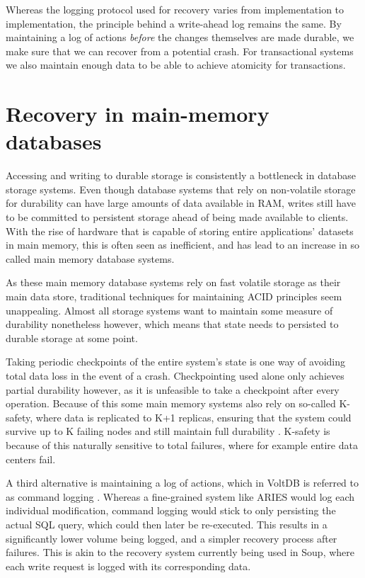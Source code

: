 \documentclass[b5paper]{report}
\begin{document}
Whereas the logging protocol used for recovery varies from implementation to
implementation, the principle behind a write-ahead log remains the same. By
maintaining a log of actions \textit{before} the changes themselves are made
durable, we make sure that we can recover from a potential crash. For
transactional systems we also maintain enough data to be able to achieve
atomicity for transactions.

\section{Recovery in main-memory databases} \label{main-memory-recovery}
Accessing and writing to durable storage is consistently a bottleneck in
database storage systems. Even though database systems that rely on non-volatile
storage for durability can have large amounts of data available in RAM, writes
still have to be committed to persistent storage ahead of being made available
to clients. With the rise of hardware that is capable of storing entire
applications' datasets in main memory, this is often seen as inefficient,
and has lead to an increase in so called main memory database systems.

As these main memory database systems rely on fast volatile storage as their
main data store, traditional techniques for maintaining ACID principles seem
unappealing. Almost all storage systems want to maintain some measure of
durability nonetheless however, which means that state needs to persisted to
durable storage at some point.

Taking periodic checkpoints of the entire system's state is one way of avoiding
total data loss in the event of a crash. Checkpointing used alone only achieves
partial durability however, as it is unfeasible to take a checkpoint after every
operation. Because of this some main memory systems also rely on so-called
K-safety, where data is replicated to K+1 replicas, ensuring that the system
could survive up to K failing nodes and still maintain full durability
\cite{early-voltdb}. K-safety is because of this naturally sensitive to total
failures, where for example entire data centers fail.

A third alternative is maintaining a log of actions, which in VoltDB is referred
to as command logging \cite{voltdb-recovery}. Whereas a fine-grained system like
ARIES would log each individual modification, command logging would stick to
only persisting the actual SQL query, which could then later be re-executed.
This results in a significantly lower volume being logged, and a simpler
recovery process after failures. This is akin to the recovery system currently
being used in Soup, where each write request is logged with its corresponding
data.
\end{document}
